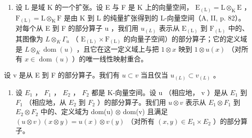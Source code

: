 \begin{enumerate}
\def\labelenumi{(\roman{enumi})}
\setcounter{enumi}{6}
\tightlist
\item
  设 L 是域 K 的一个扩张。设 E 与 F 是 K 上的向量空间， \(\mathrm{E}_{(\mathrm{L})} = \mathrm{L} \otimes_{\mathrm{K}} \mathrm{E}\) ， \(\mathrm{F}_{(\mathrm{L})} = \mathrm{L} \otimes_{\mathrm{K}} \mathrm{F}\) 是由 K 到 L 的纯量扩张得到的 L-向量空间（A, II, p. 82）。对每个从 E 到 F 的部分算子 u ，我们用 \(u_{(L)}\) 表示从 \(\mathrm{E}_{(\mathrm{L})}\) 到 \(\mathrm{F}_{(\mathrm{L})}\) 中的、其图像为 \(L \otimes_{K} \Gamma_{u}\) （ \(\mathrm{E}_{(\mathrm{L})} \times \mathrm{F}_{(\mathrm{L})}\) 的向量子空间）的部分算子；它的定义域是 \(L \otimes_{K} \operatorname{dom}(u)\) ，且它在这一定义域上与把 \(1 \otimes x\) 映到 \(1 \otimes u(x)\) （对所有 \(x \in \operatorname{dom}(u)\) ）的唯一线性映射重合。
\end{enumerate}

设 v 是从 E 到 F 的部分算子。我们有 \(u \subset v\) 当且仅当 \(u_{(L)} \subset v_{(L)}\) 。

\begin{enumerate}
\def\labelenumi{(\roman{enumi})}
\setcounter{enumi}{7}
\tightlist
\item
  设 \(E_{1}\) ， \(F_{1}\) ， \(E_{2}\) ， \(F_{2}\) 都是 K-向量空间。设 u （相应地， v ）是从 \(E_{1}\) 到 \(F_{1}\) （相应地，从 \(E_{2}\) 到 \(F_{2}\) ）的部分算子。我们用 \(u \otimes v\) 表示从 \(E_{1} \otimes F_{1}\) 到 \(E_{2} \otimes F_{2}\) 中的、定义域为 dom(u) \(\otimes\) dom(v) 且满足 \((u \otimes v)(x \otimes y) = u(x) \otimes v(y)\) （对所有 \((x, y) \in E_{1} \times E_{2}\) ）的部分算子。
\end{enumerate}

